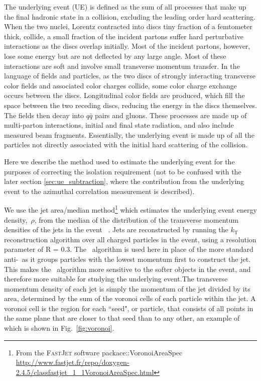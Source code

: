 The underlying event (UE) is defined as the sum of all processes that make up the final hadronic state in a collision, excluding the leading order hard scattering. When the two nuclei, Lorentz contracted into discs tiny fraction of a femtometer thick, collide, a small fraction of the incident partons suffer hard perturbative interactions as the discs overlap initially. Most of the incident partons, however, lose some energy but are not deflected by any large angle. Most of these interactions are soft and involve small transverse momentum transfer. In the language of fields and particles, as the two discs of strongly interacting transverse color fields and associated color charges collide, some color charge exchange occurs between the discs. Longitudinal color fields are produced, which fill the space between the two receding discs, reducing the energy in the discs themselves. The fields then decay into $q\bar{q}$ pairs and gluons. These processes are made up of multi-parton interactions, initial and final state radiation, and also include measured beam fragments. Essentially, the underlying event is made up of all the particles not directly associated with the initial hard scattering of the collision.

Here we describe the method used to estimate the underlying event for the purposes of correcting the isolation requirement (not to be confused with the later section \ref{sec:ue_subtraction}, where the contribution from the underlying event to the azimuthal correlation measurement is described).

We use the jet area/median method\footnote{From the \textsc{FastJet} software packace::VoronoiAreaSpec \url{http://www.fastjet.fr/repo/doxygen-2.4.5/classfastjet_1_1VoronoiAreaSpec.html} } which estimates the underlying event energy density,~$\rho$, from the median of the distribution of the transverse momentum densities of the jets in the event ~\cite{Cacciari:2009dp}. Jets are reconstructed by running the $k_\mathrm{T}$ reconstruction algorithm over all charged particles in the event, using a resolution parameter of R = 0.3. The \kt~algorithm is used here in place of the more standard anti-\kt~as it groups particles with the lowest momentum first to construct the jet. This makes the \kt~algorithm more sensitive to the softer objects in the event, and therefore more suitable for studying the underlying event.The transverse momentum density of each jet is simply the momentum of the jet divided by its area, determined by the sum of the voronoi cells of each particle within the jet. A voronoi cell is the region for each ``seed", or particle, that  consists of all points in the same  plane that are closer to that seed than to any other, an example of which is shown in Fig.~\ref{fig:voronoi}. 

